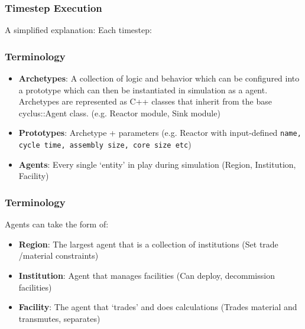 \begin{frame}
    \frametitle{Timestep Execution}
    A simplified explanation: Each timestep:
    
\begin{figure}[H]
\centering
{}
\end{figure}

\end{frame}

\begin{frame}
	\frametitle{Terminology}
	\begin{itemize}
		\item \textbf{Archetypes}: A collection of logic and behavior which can be configured into a prototype which can then be instantiated in simulation as a agent. Archetypes are represented as C++ classes that inherit from the base cyclus::Agent class. (e.g. Reactor module, Sink module)
		\item \textbf{Prototypes}: Archetype + parameters (e.g. Reactor with input-defined  \texttt{name, cycle time, assembly size, core size etc})
		\item \textbf{Agents}: Every single `entity' in play during simulation (Region, Institution, Facility)
	\end{itemize}
\end{frame}

\begin{frame}
	\frametitle{Terminology}
	Agents can take the form of:
	\begin{itemize}
		\item \textbf{Region}: The largest agent that is a collection of institutions (Set trade /material constraints)
		\item \textbf{Institution}: Agent that manages facilities (Can deploy, decommission facilities)
		\item \textbf{Facility}: The agent that `trades' and does calculations (Trades material and transmutes, separates)
	\end{itemize}
\end{frame}

